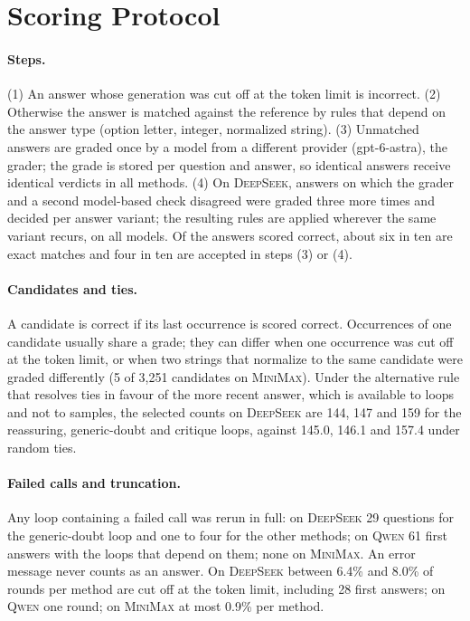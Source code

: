 \documentclass[11pt]{article}
\newcommand{\ds}{\textsc{DeepSeek}}
\newcommand{\qw}{\textsc{Qwen}}
\newcommand{\mm}{\textsc{MiniMax}}
\begin{document}
\section{Scoring Protocol}
\label{app:scoring}

\paragraph{Steps.}
(1) An answer whose generation was cut off at the token limit is incorrect.
(2) Otherwise the answer is matched against the reference by rules that depend on the answer type (option letter, integer, normalized string).
(3) Unmatched answers are graded once by a model from a different provider (gpt-6-astra), the grader; the grade is stored per question and answer, so identical answers receive identical verdicts in all methods.
(4) On \ds, answers on which the grader and a second model-based check disagreed were graded three more times and decided per answer variant; the resulting rules are applied wherever the same variant recurs, on all models.
Of the answers scored correct, about six in ten are exact matches and four in ten are accepted in steps (3) or (4).

\paragraph{Candidates and ties.}
A candidate is correct if its last occurrence is scored correct.
Occurrences of one candidate usually share a grade; they can differ when one occurrence was cut off at the token limit, or when two strings that normalize to the same candidate were graded differently (5 of 3{,}251 candidates on \mm).
Under the alternative rule that resolves ties in favour of the more recent answer, which is available to loops and not to samples, the selected counts on \ds{} are 144, 147 and 159 for the reassuring, generic-doubt and critique loops, against 145.0, 146.1 and 157.4 under random ties.

\paragraph{Failed calls and truncation.}
Any loop containing a failed call was rerun in full: on \ds{} 29 questions for the generic-doubt loop and one to four for the other methods; on \qw{} 61 first answers with the loops that depend on them; none on \mm.
An error message never counts as an answer.
On \ds{} between 6.4\% and 8.0\% of rounds per method are cut off at the token limit, including 28 first answers; on \qw{} one round; on \mm{} at most 0.9\% per method.
\end{document}
